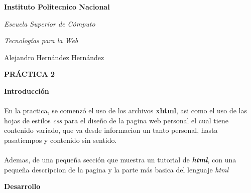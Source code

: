 \documentclass[12pt,letterpaper, spanish]{article}
\begin{document}
{\Huge {\rm { \bf Instituto Politecnico Nacional}}}\\
\begin{center}
{\huge {\rm {\em Escuela Superior de C\'omputo}}} \\
\end{center}
\begin{center}
{\Large {\em Tecnolog\'ias para la Web}}\\
\end{center}
\begin{center}
{\Large Alejandro Hern\'andez Hern\'andez}\\
\end{center}
\begin{center}
{\huge {\bf PR\'ACTICA 2}}
\end{center}

\newpage
{\Huge{\rm {\bf Introducci\'on}}}
\\\\En la practica, se comenz\'o el uso de los archivos {\bf xhtml}, asi como el uso de las hojas de estilos {\em css} para el dise\~no de la pagina web personal el cual tiene contenido variado, que va desde informacion un tanto personal, hasta pasatiempos y contenido sin sentido.\\
\\Ademas, de una peque\~na secci\'on que muestra un tutorial de {\bf {\em html}}, con una peque\~na descripcion de la pagina y la parte m\'as basica del lenguaje {\em html}

\newpage
{\Huge {\rm {\bf Desarrollo}}}
\end{document}
